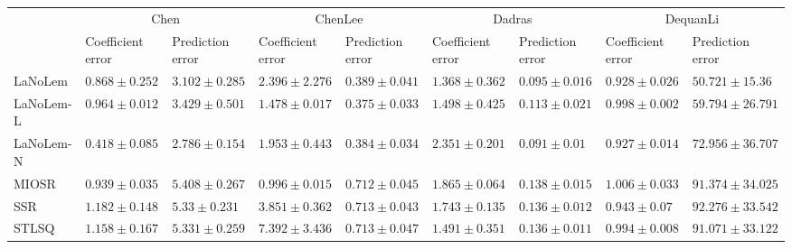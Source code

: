\begin{table*}
{\begin{tabular}{lllllllll}
 & \multicolumn{2}{c}{Chen} & \multicolumn{2}{c}{ChenLee} & \multicolumn{2}{c}{Dadras} & \multicolumn{2}{c}{DequanLi} \\
 & Coefficient error & Prediction error & Coefficient error & Prediction error & Coefficient error & Prediction error & Coefficient error & Prediction error \\
\midrule
LaNoLem & $0.868\pm 0.252$ & $3.102\pm 0.285$ & $2.396\pm 2.276$ & $0.389\pm 0.041$ & $\mathbf{1.368}\pm 0.362$ & $0.095\pm 0.016$ & $0.928\pm 0.026$ & $\mathbf{50.721}\pm 15.36$ \\
LaNoLem-L & $0.964\pm 0.012$ & $3.429\pm 0.501$ & $1.478\pm 0.017$ & $\mathbf{0.375}\pm 0.033$ & $1.498\pm 0.425$ & $0.113\pm 0.021$ & $0.998\pm 0.002$ & $59.794\pm 26.791$ \\
LaNoLem-N & $\mathbf{0.418}\pm 0.085$ & $\mathbf{2.786}\pm 0.154$ & $1.953\pm 0.443$ & $0.384\pm 0.034$ & $2.351\pm 0.201$ & $\mathbf{0.091}\pm 0.01$ & $\mathbf{0.927}\pm 0.014$ & $72.956\pm 36.707$ \\
MIOSR & $0.939\pm 0.035$ & $5.408\pm 0.267$ & $\mathbf{0.996}\pm 0.015$ & $0.712\pm 0.045$ & $1.865\pm 0.064$ & $0.138\pm 0.015$ & $1.006\pm 0.033$ & $91.374\pm 34.025$ \\
SSR & $1.182\pm 0.148$ & $5.33\pm 0.231$ & $3.851\pm 0.362$ & $0.713\pm 0.043$ & $1.743\pm 0.135$ & $0.136\pm 0.012$ & $0.943\pm 0.07$ & $92.276\pm 33.542$ \\
STLSQ & $1.158\pm 0.167$ & $5.331\pm 0.259$ & $7.392\pm 3.436$ & $0.713\pm 0.047$ & $1.491\pm 0.351$ & $0.136\pm 0.011$ & $0.994\pm 0.008$ & $91.071\pm 33.122$ \\

\midrule


\end{tabular}}
\end{table*}
